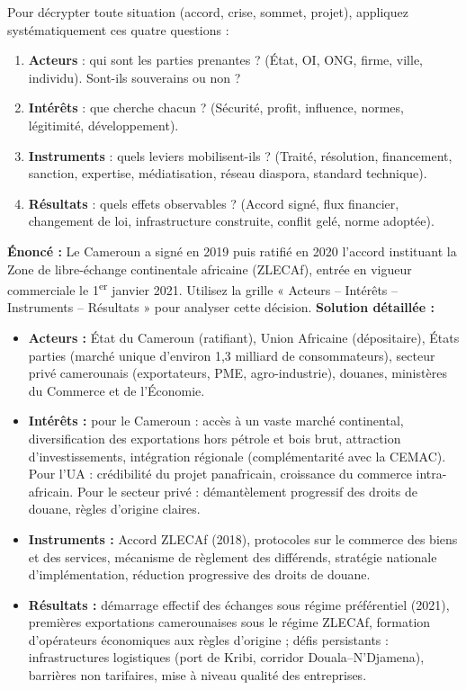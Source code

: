 \documentclass[11pt]{article}
\begin{document}
\begin{methode}
Pour décrypter toute situation (accord, crise, sommet, projet), appliquez systématiquement ces quatre questions :
\begin{enumerate}
\item \textbf{Acteurs} : qui sont les parties prenantes ? (État, OI, ONG, firme, ville, individu). Sont-ils souverains ou non ?
\item \textbf{Intérêts} : que cherche chacun ? (Sécurité, profit, influence, normes, légitimité, développement).
\item \textbf{Instruments} : quels leviers mobilisent-ils ? (Traité, résolution, financement, sanction, expertise, médiatisation, réseau diaspora, standard technique).
\item \textbf{Résultats} : quels effets observables ? (Accord signé, flux financier, changement de loi, infrastructure construite, conflit gelé, norme adoptée).
\end{enumerate}
\end{methode}

\begin{exoresolu}
\textbf{Énoncé :} Le Cameroun a signé en 2019 puis ratifié en 2020 l'accord instituant la Zone de libre-échange continentale africaine (ZLECAf), entrée en vigueur commerciale le 1\textsuperscript{er} janvier 2021. Utilisez la grille « Acteurs – Intérêts – Instruments – Résultats » pour analyser cette décision.
\tcblower
\textbf{Solution détaillée :}
\begin{itemize}
\item \textbf{Acteurs :} État du Cameroun (ratifiant), Union Africaine (dépositaire), États parties (marché unique d'environ 1,3 milliard de consommateurs), secteur privé camerounais (exportateurs, PME, agro-industrie), douanes, ministères du Commerce et de l'Économie.
\item \textbf{Intérêts :} pour le Cameroun : accès à un vaste marché continental, diversification des exportations hors pétrole et bois brut, attraction d'investissements, intégration régionale (complémentarité avec la CEMAC). Pour l'UA : crédibilité du projet panafricain, croissance du commerce intra-africain. Pour le secteur privé : démantèlement progressif des droits de douane, règles d'origine claires.
\item \textbf{Instruments :} Accord ZLECAf (2018), protocoles sur le commerce des biens et des services, mécanisme de règlement des différends, stratégie nationale d'implémentation, réduction progressive des droits de douane.
\item \textbf{Résultats :} démarrage effectif des échanges sous régime préférentiel (2021), premières exportations camerounaises sous le régime ZLECAf, formation d'opérateurs économiques aux règles d'origine ; défis persistants : infrastructures logistiques (port de Kribi, corridor Douala–N'Djamena), barrières non tarifaires, mise à niveau qualité des entreprises.
\end{itemize}
\end{exoresolu}
\end{document}
